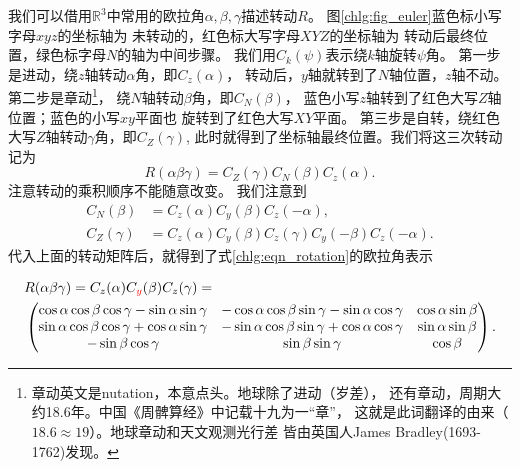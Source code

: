 我们可以借用$\mathbb{R}^3$中常用的欧拉角$\alpha,\beta,\gamma$描述转动$R$。
图\ref{chlg:fig_euler}蓝色标小写字母$xyz$的坐标轴为
未转动的，红色标大写字母$XYZ$的坐标轴为
转动后最终位置，绿色标字母$N$的轴为中间步骤。
我们用$C_k(\psi)$表示绕$k$轴旋转$\psi$角。
第一步是进动，绕$z$轴转动$\alpha$角，即$C_z(\alpha)$，
转动后，$y$轴就转到了$N$轴位置，$z$轴不动。
第二步是章动{\footnote{章动英文是nutation，本意点头。地球除了进动（岁差），
        还有章动，周期大约18.6年。中国《周髀算经》中记载十九为一“章”，
        这就是此词翻译的由来（$18.6\approx 19$）。地球章动和天文观测光行差
        皆由英国人James Bradley(1693-1762)发现。}}，
    绕$N$轴转动$\beta$角，即$C_N(\beta)$，
蓝色小写$z$轴转到了红色大写$Z$轴位置；蓝色的小写$xy$平面也
旋转到了红色大写$XY$平面。
第三步是自转，绕红色大写$Z$轴转动$\gamma$角，即$C_Z(\gamma)$,
此时就得到了坐标轴最终位置。我们将这三次转动记为
\begin{equation}\label{chlg:eqn_rotation}
    R(\alpha\beta\gamma)=C_Z(\gamma)C_N(\beta)C_z(\alpha) .
\end{equation}
注意转动的乘积顺序不能随意改变。%
我们注意到
\begin{align}
    C_N(\beta) &=C_z(\alpha)C_y(\beta)C_z(-\alpha) , \label{chlg:eqn_N_rotation} \\
    C_Z(\gamma)&=C_z(\alpha)C_y(\beta)C_z(\gamma)C_y(-\beta)C_z(-\alpha) . \label{chlg:eqn_Z_rotation}
\end{align}
代入上面的转动矩阵后，就得到了式\eqref{chlg:eqn_rotation}的欧拉角表示
\begin{small}

\begin{equation}\label{chlg:eqn_rotation_euler_y}
    \begin{aligned}
        &R(\alpha\beta\gamma)=C_z(\alpha)C_{\color{red}{y}}(\beta)C_z(\gamma) =   \\
        &\begin{pmatrix}
            \cos\alpha\cos\beta\cos\gamma -\sin\alpha \sin\gamma  &  -\cos\alpha \cos\beta \sin\gamma -\sin\alpha \cos\gamma & \cos\alpha \sin\beta  \\
            \sin\alpha\cos\beta\cos\gamma +\cos\alpha \sin\gamma  &  -\sin\alpha \cos\beta \sin\gamma +\cos\alpha \cos\gamma & \sin\alpha \sin\beta  \\
            -\sin\beta \cos\gamma & \sin\beta \sin\gamma & \cos\beta
        \end{pmatrix} .
    \end{aligned}
\end{equation}
\end{small}

